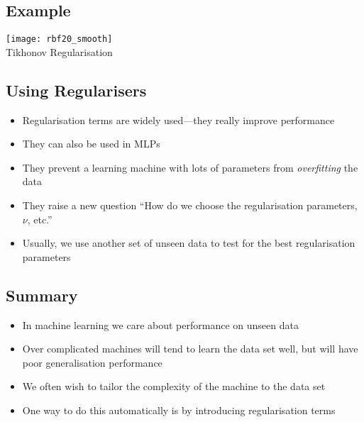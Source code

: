 \begin{slide}
\section[-1]{Example}

\begin{center}
  \texttt{[image: rbf20\_smooth]}\\
  Tikhonov Regularisation\pause
\end{center}

\end{slide}


\begin{slide}
\section{Using Regularisers}

\begin{PauseHighLight}
  \begin{itemize}
  \item Regularisation terms are widely used---they really improve
    performance\pause
  \item They can also be used in MLPs\pause
  \item They prevent a learning machine with lots of parameters from
    \emph{overfitting} the data\pause
  \item They raise a new question ``How do we choose the regularisation
    parameters, $\nu$, etc.''\pause
  \item Usually, we use another set of unseen data to test for
    the best regularisation parameters\pause
  \end{itemize}
\end{PauseHighLight}

\end{slide}


\begin{slide}
\section{Summary}

\begin{PauseHighLight}
  \begin{itemize}
  \item In machine learning we care about performance on unseen
    data\pause
  \item Over complicated machines will tend to learn the data set well,
    but will have poor generalisation performance\pause
  \item We often wish to tailor the complexity of the machine to the
    data set\pause
  \item One way to do this automatically is by introducing
    regularisation terms\pause
  \end{itemize}
\end{PauseHighLight}

\end{slide}
